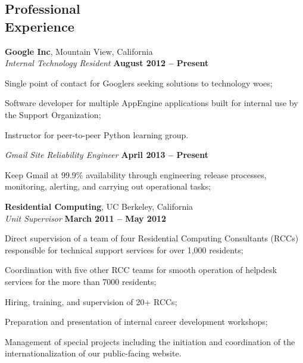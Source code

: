 \documentclass[margin,line]{resume}
\begin{document}
\begin{resume}
	\section{\mysidestyle Professional\\Experience}

	\textbf{Google Inc}, Mountain View, California \vspace{1mm}\\\vspace{0mm}%
	\textsl{Internal Technology Resident} \hfill \textbf{August 2012 -- Present}
	\begin{list2}
		\item Single point of contact for Googlers seeking solutions to technology woes;
		\item Software developer for multiple AppEngine applications built for internal use by the Support Organization;
		\item Instructor for peer-to-peer Python learning group.
	\end{list2}\vspace{-1.5mm}

	\textsl{Gmail Site Reliability Engineer} \hfill \textbf{April 2013 -- Present}
	\begin{list2}
		\item Keep Gmail at 99.9\% availability through engineering release processes, monitoring, alerting, and carrying out operational tasks;
	\end{list2}\vspace{-1.5mm}

	\textbf{Residential Computing}, UC Berkeley, California \vspace{1mm}\\\vspace{0mm}%
	\textsl{Unit Supervisor} \hfill \textbf{March 2011 -- May 2012}
	\begin{list2}
		\item Direct supervision of a team of four Residential Computing Consultants (RCCs) responsible for technical support services for over 1,000 residents;
		\item Coordination with five other RCC teams for smooth operation of helpdesk services for the more than 7000 residents;
		\item Hiring, training, and supervision of 20+ RCCs;
		\item Preparation and presentation of internal career development workshops;
		\item Management of special projects including the initiation and coordination of the internationalization of our public-facing website.
	\end{list2}\vspace{-1.5mm}
	

\end{resume}
\end{document}
